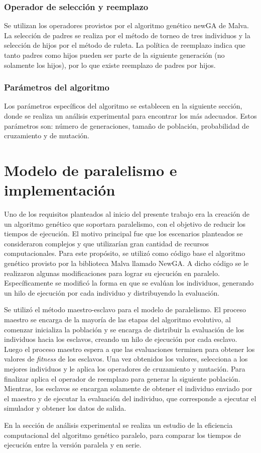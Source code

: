 \subsubsection{Operador de selección y reemplazo}
Se  utilizan los operadores provistos por el algoritmo genético newGA de Malva. La selección de padres se realiza por el método de torneo de tres individuos y la selección de hijos por el método de ruleta. La política de reemplazo indica que tanto padres como hijos pueden ser parte de la siguiente generación (no solamente los hijos), por lo que existe reemplazo de padres por hijos.

\subsubsection{Parámetros del algoritmo}
Los parámetros específicos del algoritmo se establecen en la siguiente sección, donde se realiza un análisis experimental para encontrar los más adecuados. Estos parámetros son: número de generaciones, tamaño de población, probabilidad de cruzamiento y de mutación.


\section{Modelo de paralelismo e implementación}

Uno de los requisitos planteados al inicio del presente trabajo era la creación de un algoritmo genético que soportara paralelismo, con el objetivo de reducir los tiempos de ejecución. El motivo principal fue que los escenarios planteados se consideraron complejos y que utilizarían gran cantidad de recursos computacionales. Para este propósito, se utilizó como código base el algoritmo genético provisto por la biblioteca Malva llamado NewGA. A dicho código se le realizaron algunas modificaciones para lograr su ejecución en paralelo. Específicamente se modificó la forma en que se evalúan los individuos, generando un hilo de ejecución por cada individuo y distribuyendo la evaluación.

Se utilizó el método maestro-esclavo para el modelo de paralelismo. El proceso maestro se encarga de la mayoría de las etapas del algoritmo evolutivo, al comenzar inicializa la población y se encarga de distribuir la evaluación de los individuos hacia los esclavos, creando un hilo de ejecución por cada esclavo. Luego el proceso maestro espera a que las evaluaciones terminen para obtener los valores de \emph{fitness} de los esclavos. Una vez obtenidos los valores, selecciona a los mejores individuos y le aplica los operadores de cruzamiento y mutación. Para finalizar aplica el operador de reemplazo para generar la siguiente población. Mientras, los esclavos se encargan solamente de obtener el individuo enviado por el maestro y de ejecutar la evaluación del individuo, que corresponde a ejecutar el simulador y obtener los datos de salida.

En la sección de análisis experimental se realiza un estudio de la eficiencia computacional del algoritmo genético paralelo, para comparar los tiempos de ejecución entre la versión paralela y en serie.